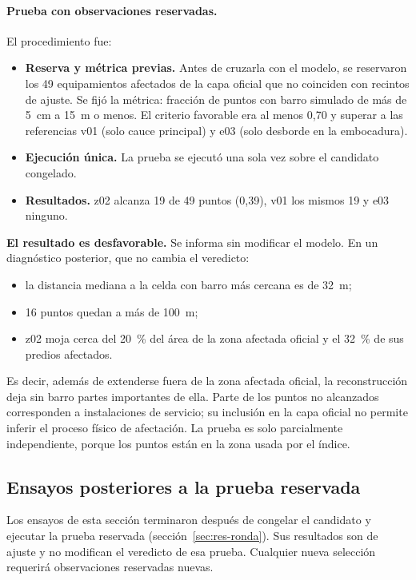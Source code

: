 \paragraph{Prueba con observaciones reservadas.} El procedimiento fue:
\begin{itemize}
\item \textbf{Reserva y métrica previas.} Antes de cruzarla con el modelo, se reservaron los 49 equipamientos afectados de la capa oficial que no coinciden con recintos de ajuste. Se fijó la métrica: fracción de puntos con barro simulado de más de \SI{5}{cm} a \SI{15}{m} o menos. El criterio favorable era al menos 0,70 y superar a las referencias v01 (solo cauce principal) y e03 (solo desborde en la embocadura).
\item \textbf{Ejecución única.} La prueba se ejecutó una sola vez sobre el candidato congelado.
\item \textbf{Resultados.} z02 alcanza 19 de 49 puntos (0,39), v01 los mismos 19 y e03 ninguno.
\end{itemize}
\textbf{El resultado es desfavorable.} Se informa sin modificar el modelo. En un diagnóstico posterior, que no cambia el veredicto:
\begin{itemize}
\item la distancia mediana a la celda con barro más cercana es de \SI{32}{m};
\item 16 puntos quedan a más de \SI{100}{m};
\item z02 moja cerca del \SI{20}{\percent} del área de la zona afectada oficial y el \SI{32}{\percent} de sus predios afectados.
\end{itemize}
Es decir, además de extenderse fuera de la zona afectada oficial, la reconstrucción deja sin barro partes importantes de ella. Parte de los puntos no alcanzados corresponden a instalaciones de servicio; su inclusión en la capa oficial no permite inferir el proceso físico de afectación. La prueba es solo parcialmente independiente, porque los puntos están en la zona usada por el índice.

\subsection{Ensayos posteriores a la prueba reservada}\label{sec:res-posterior}
Los ensayos de esta sección terminaron después de congelar el candidato y ejecutar la prueba reservada (sección~\ref{sec:res-ronda}). Sus resultados son de ajuste y no modifican el veredicto de esa prueba. Cualquier nueva selección requerirá observaciones reservadas nuevas.

